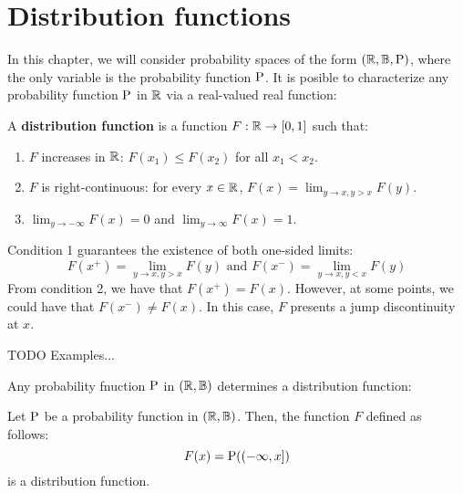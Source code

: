 \section{Distribution functions}

In this chapter, we will consider probability spaces of the form $(\R, \B, \P)$, where the only variable is the probability function $\P$. It is posible to characterize any probability
function $\P$ in $\R$ via a real-valued real function:

\begin{definition}
	A \textbf{distribution function} is a function $F: \R \rightarrow [0, 1]$ such that:
	\begin{enumerate}
		\item $F$ increases in $\R$: $F(x_1) \leq F(x_2)$ for all $x_1 < x_2$.
		\item $F$ is right-continuous: for every $x \in \R$, $F(x) = \lim_{y \rightarrow x, y > x} F(y)$.
		\item $\lim_{y \rightarrow -\infty} F(x) = 0$ and $\lim_{y \rightarrow \infty} F(x) = 1$.
	\end{enumerate}
\end{definition}

Condition 1 guarantees the existence of both one-sided limits:
\[
	F(x^+) = \lim_{y \rightarrow x, y > x} F(y) \text{  and  } F(x^-) = \lim_{y \rightarrow x, y < x} F(y)
\]
From condition 2, we have that $F(x^+) = F(x)$. However, at some points, we could have that $F(x^-) \neq F(x)$. In this case, $F$ presents a jump discontinuity at $x$.

TODO Examples...

Any probability fnuction $\P$ in $(\R, \B)$ determines a distribution function:

\begin{prop}
	Let $\P$ be a probability function in $(\R, \B)$. Then, the function $F$ defined as follows:
	\[
		F(x) = \P((-\infty, x])
	\]
	is a distribution function.
\end{prop}
